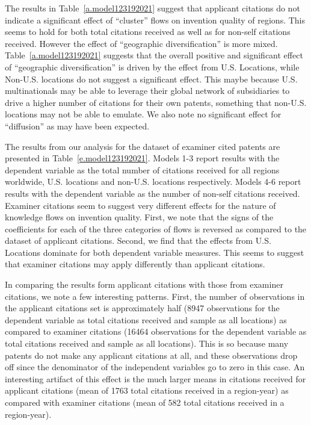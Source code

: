 \documentclass[12pt,letterpaper]{article}
\begin{document}

The results in Table~\ref{a.model123192021} suggest that applicant citations do not indicate a significant effect of ``cluster'' flows on invention quality of regions. This seems to hold for both total citations received as well as for non-self citations received. However the effect of ``geographic diversification'' is more mixed. Table~\ref{a.model123192021} suggests that the overall positive and significant effect of ``geographic diversification'' is driven by the effect from U.S. Locations, while Non-U.S. locations do not suggest a significant effect. This maybe because U.S. multinationals may be able to leverage their global network of subsidiaries to drive a higher number of citations for their own patents, something that non-U.S. locations may not be able to emulate. We also note no significant effect for ``diffusion'' as may have been expected.



The results from our analysis for the dataset of examiner cited patents are presented in Table~\ref{e.model123192021}. Models 1-3 report results with the dependent variable as the total number of citations received for all regions worldwide, U.S. locations and non-U.S. locations respectively. Models 4-6 report results with the dependent variable as the number of non-self citations received. Examiner citations seem to suggest very different effects for the nature of knowledge flows on invention quality. First, we note that the signs of the coefficients for each of the three categories of flows is reversed as compared to the dataset of applicant citations. Second, we find that the effects from U.S. Locations dominate for both dependent variable measures. This seems to suggest that examiner citations may apply differently than applicant citations.



In comparing the results form applicant citations with those from examiner citations, we note a few interesting patterns. First, the number of observations in the applicant citations set is approximately half (8947 observations for the dependent variable as total citations received and sample as all locations) as compared to examiner citations (16464 observations for the dependent variable as total citations received and sample as all locations). This is so because many patents do not make any applicant citations at all, and these observations drop off since the denominator of the independent variables go to zero in this case. An interesting artifact of this effect is the much larger means in citations received for applicant citations (mean of 1763 total citations received in a region-year) as compared with examiner citations (mean of 582 total citations received in a region-year). \par
\end{document}
